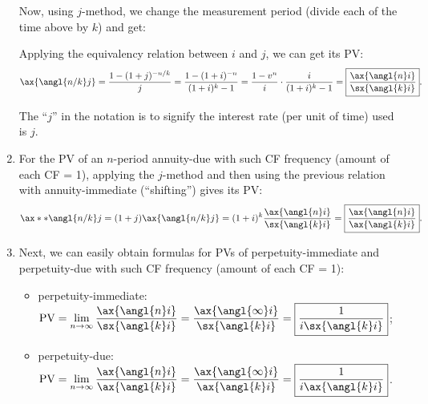 \begin{enumerate}
\begin{center}
\end{center}
Now, using \(j\)-method, we change the measurement period (divide each of the
time above by \(k\)) and get:
\begin{center}
\end{center}
Applying the equivalency relation between \(i\) and \(j\), we can get its PV:
\[
\ax{\angl{n/k}j}=\frac{1-(1+j)^{-n/k}}{j}
=\frac{1-(1+i)^{-n}}{(1+i)^k-1}=\frac{1-v^n}{i}\cdot\frac{i}{(1+i)^k-1}
=\boxed{\frac{\ax{\angl{n}i}}{\sx{\angl{k}i}}}.
\]
\begin{note}
The ``\(j\)'' in the notation is to signify the interest rate (per unit of
time) used is \(j\).
\end{note}

\item \label{it:pv-annuity-due-less-freq}
For the PV of an \(n\)-period annuity-due with such CF frequency (amount of
each CF = 1), applying the \(j\)-method and then using the previous relation
with annuity-immediate (``shifting'') gives its PV:
\[
\ax**{\angl{n/k}j}=(1+j)\ax{\angl{n/k}j}=(1+i)^{k}\frac{\ax{\angl{n}i}}{\sx{\angl{k}i}}
=\boxed{\frac{\ax{\angl{n}i}}{\ax{\angl{k}i}}}.
\]
\item\label{it:pv-perpetuities-less-freq}
Next, we can easily obtain formulas for PVs of perpetuity-immediate and
perpetuity-due with such CF frequency (amount of each CF = 1):
\begin{itemize}
\item perpetuity-immediate: \(\displaystyle \text{PV}=\lim_{n\to \infty}\frac{\ax{\angl{n}i}}{\sx{\angl{k}i}}
=\frac{\ax{\angl{\infty}i}}{\sx{\angl{k}i}}=\boxed{\frac{1}{i\sx{\angl{k}i}}}\);
\item perpetuity-due: \(\displaystyle \text{PV}=\lim_{n\to \infty}\frac{\ax{\angl{n}i}}{\ax{\angl{k}i}}
=\frac{\ax{\angl{\infty}i}}{\ax{\angl{k}i}}=\boxed{\frac{1}{i\ax{\angl{k}i}}}\).
\end{itemize}
\end{enumerate}
